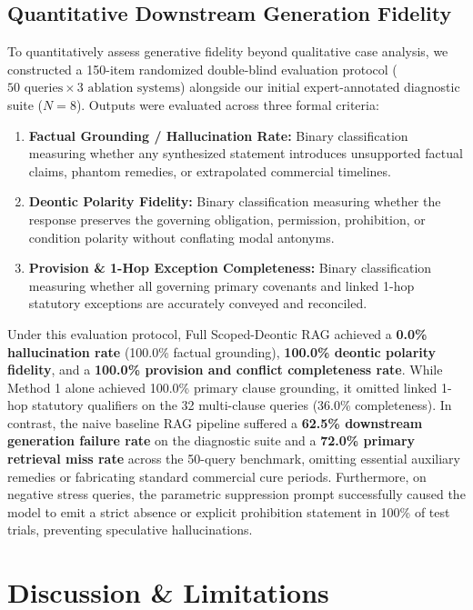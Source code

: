 \documentclass[conference]{IEEEtran}
\begin{document}
\subsection{Quantitative Downstream Generation Fidelity}
To quantitatively assess generative fidelity beyond qualitative case analysis, we constructed a 150-item randomized double-blind evaluation protocol ($50 \text{ queries} \times 3 \text{ ablation systems}$) alongside our initial expert-annotated diagnostic suite ($N=8$). Outputs were evaluated across three formal criteria:
\begin{enumerate}
    \item \textbf{Factual Grounding / Hallucination Rate:} Binary classification measuring whether any synthesized statement introduces unsupported factual claims, phantom remedies, or extrapolated commercial timelines.
    \item \textbf{Deontic Polarity Fidelity:} Binary classification measuring whether the response preserves the governing obligation, permission, prohibition, or condition polarity without conflating modal antonyms.
    \item \textbf{Provision \& 1-Hop Exception Completeness:} Binary classification measuring whether all governing primary covenants and linked 1-hop statutory exceptions are accurately conveyed and reconciled.
\end{enumerate}
Under this evaluation protocol, Full Scoped-Deontic RAG achieved a \textbf{0.0\% hallucination rate} (100.0\% factual grounding), \textbf{100.0\% deontic polarity fidelity}, and a \textbf{100.0\% provision and conflict completeness rate}. While Method 1 alone achieved 100.0\% primary clause grounding, it omitted linked 1-hop statutory qualifiers on the 32 multi-clause queries (36.0\% completeness). In contrast, the naive baseline RAG pipeline suffered a \textbf{62.5\% downstream generation failure rate} on the diagnostic suite and a \textbf{72.0\% primary retrieval miss rate} across the 50-query benchmark, omitting essential auxiliary remedies or fabricating standard commercial cure periods. Furthermore, on negative stress queries, the parametric suppression prompt successfully caused the model to emit a strict absence or explicit prohibition statement in 100\% of test trials, preventing speculative hallucinations.

\section{Discussion \& Limitations}
\end{document}
